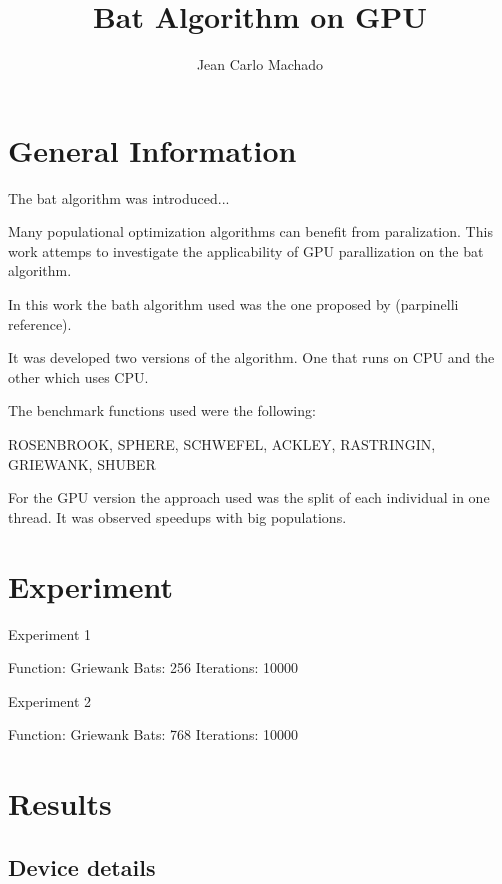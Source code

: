 \documentclass[12pt]{article}
\title{Bat Algorithm on GPU}
\author{Jean Carlo Machado\inst{1}}
\begin{document}
\maketitle

\begin{abstract}
\end{abstract}

\begin{resumo}
\end{resumo}


\section{General Information}

The bat algorithm was introduced...

Many populational optimization algorithms can benefit from paralization. This work attemps to investigate the 
applicability of GPU parallization on the bat algorithm.


In this work the bath algorithm used was the one proposed by (parpinelli reference).

It was developed two versions of the algorithm. One that runs on CPU and the other which uses CPU.


The benchmark functions used were the following:

ROSENBROOK, SPHERE, SCHWEFEL, ACKLEY, RASTRINGIN, GRIEWANK, SHUBER

For the GPU version the approach used was the split of each individual in one thread.
It was observed speedups with big populations.


\section{Experiment}

Experiment 1

Function: Griewank
Bats: 256
Iterations: 10000


Experiment 2

Function: Griewank
Bats: 768
Iterations: 10000



\section{Results}


\subsection{Device details}
\end{document}
